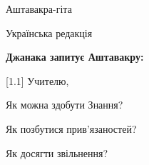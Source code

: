 \thispagestyle{empty}
\vspace*{\fill}
\begin{center}
{\Huge Аштавакра-гіта}

\bigskip
{\large Українська редакція}
\end{center}
\vspace*{\fill}
\noindent\textbf{Джанака запитує Аштавакру:}

[1.1] Учителю,

Як можна здобути Знання?

Як позбутися прив'язаностей?

Як досягти звільнення?
\newpage
